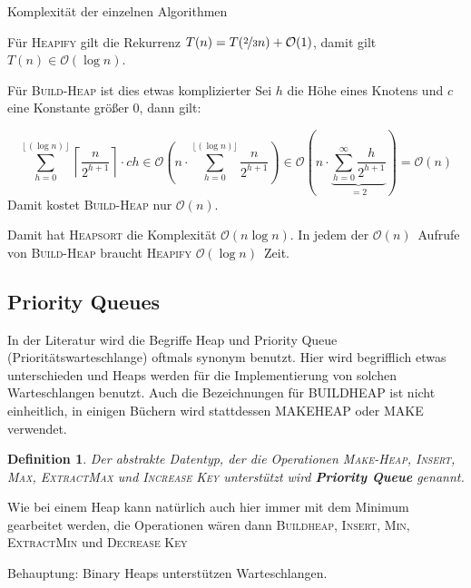 \documentclass[ngerman,draft,parskip=half*,twoside]{scrreprt}
\theoremstyle{break}
\newtheorem{definition}{Definition}[chapter]
\theoremstyle{nonumberbreak}
\newcommand*{\OO}{\mathcal{O}}      %
\begin{document}
Komplexität der einzelnen Algorithmen

Für \textsc{Heapify} gilt die Rekurrenz
$T(n)=T(\nicefrac{2}{3}n)+\OO(1)$, damit gilt $T(n)\in\OO(\log n)$.

Für \textsc{Build-Heap} ist dies etwas komplizierter Sei $h$ die Höhe eines Knotens und $c$ eine Konstante größer 0, dann gilt:
 
\[\sum_{h=0}^{\left\lfloor(\log n)\right\rfloor}\left\lceil\frac{n}{2^{h+1}}\right\rceil \cdot ch \in \OO(n\cdot\sum_{h=0}^{\lfloor(\log
n)\rfloor}
\frac{n}{2^{h+1}}) \in \OO\left(n\cdot\underbrace{\sum_{h=0}^{\infty}
\frac{h}{2^{h+1}}}_{=2}\right)=\OO(n)\] 
Damit kostet \textsc{Build-Heap} nur $\OO(n)$.

Damit hat \textsc{Heapsort} die Komplexität $\OO(n \log n)$. In jedem der $\OO(n)$~Aufrufe von \textsc{Build-Heap}  braucht
\textsc{Heapify} $\OO(\log n)$~Zeit.
%
\subsection{Priority Queues}
In der Literatur wird die Begriffe Heap und Priority Queue (Prioritätswarteschlange) oftmals synonym benutzt. Hier wird begrifflich
etwas unterschieden und Heaps werden für die Implementierung von solchen Warteschlangen benutzt. Auch die Bezeichnungen für
\textsc{BUILDHEAP} ist nicht einheitlich, in einigen Büchern wird stattdessen \textsc{MAKEHEAP} oder \textsc{MAKE} verwendet.

\begin{definition}
Der abstrakte Datentyp, der die Operationen \textsc{Make-Heap, Insert, Max, ExtractMax} und \textsc{Increase Key} unterstützt wird
\textbf{Priority
Queue} genannt.
\end{definition}

Wie bei einem Heap kann natürlich auch hier immer mit dem Minimum gearbeitet werden, die Operationen wären dann \textsc{Buildheap,
Insert, Min, ExtractMin} und \textsc{Decrease Key}

Behauptung: Binary Heaps unterstützen Warteschlangen.
\end{document}
